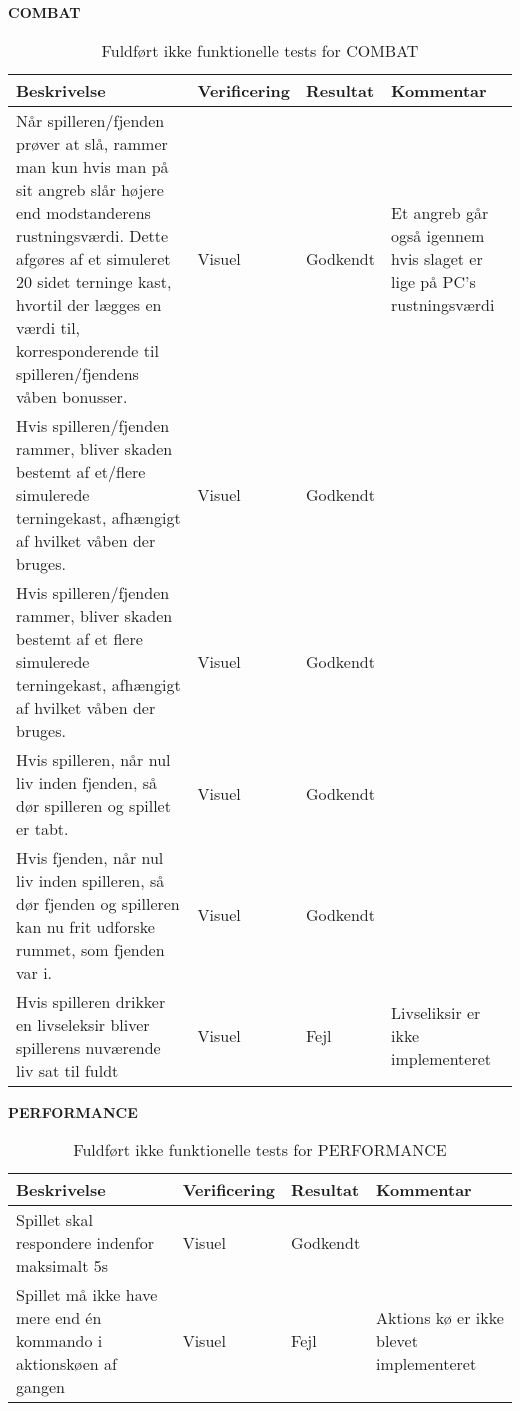 \bf{COMBAT}\\
\begin{table}[H]
\caption{ Fuldført ikke funktionelle tests for COMBAT}
\label{tab:}
\begin{tabular}{|p{3cm}|p{3cm}|p{3cm}|p{3cm}|}
\hline
Beskrivelse & Verificering & Resultat & Kommentar \\
\hline
Når spilleren/fjenden prøver at slå, rammer man kun hvis man på sit angreb slår højere end modstanderens rustningsværdi. Dette afgøres af et simuleret 20 sidet terninge kast, hvortil der lægges en værdi til, korresponderende til spilleren/fjendens våben bonusser. & Visuel & Godkendt & Et angreb går også igennem hvis slaget er lige på PC's rustningsværdi \\
\hline
Hvis spilleren/fjenden rammer, bliver skaden bestemt af et/flere simulerede terningekast, afhængigt af hvilket våben der bruges. & Visuel & Godkendt &\\
\hline
Hvis spilleren/fjenden rammer, bliver skaden bestemt af et flere simulerede terningekast, afhængigt af hvilket våben der bruges.  & Visuel & Godkendt & \\
\hline
Hvis spilleren, når nul liv inden fjenden, så dør spilleren og spillet er tabt. & Visuel & Godkendt & \\
\hline
Hvis fjenden, når nul liv inden spilleren, så dør fjenden og spilleren kan nu frit udforske rummet, som fjenden var i. & Visuel & Godkendt & \\
\hline
Hvis spilleren drikker en livseleksir bliver spillerens nuværende liv sat til fuldt & Visuel & Fejl & Livseliksir er ikke implementeret \\
\hline
\end{tabular}
\end{table}

\bf{PERFORMANCE}
\begin{table}[H]
\caption{ Fuldført ikke funktionelle tests for PERFORMANCE}
\label{tab:}
\begin{tabular}{|p{3cm}|p{3cm}|p{3cm}|p{3cm}|}
\hline
Beskrivelse & Verificering & Resultat & Kommentar \\
\hline
 Spillet skal respondere indenfor maksimalt 5s & Visuel & Godkendt & \\
\hline
 Spillet må ikke have mere end én kommando i aktionskøen af gangen & Visuel & Fejl & Aktions kø er ikke blevet implementeret\\
\hline
\end{tabular}
\end{table}

